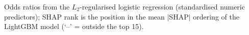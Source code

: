 {\footnotesize Odds ratios from the $L_2$-regularised logistic regression (standardised numeric predictors); SHAP rank is the position in the mean $|$SHAP$|$ ordering of the LightGBM model (`--' = outside the top 15).}
